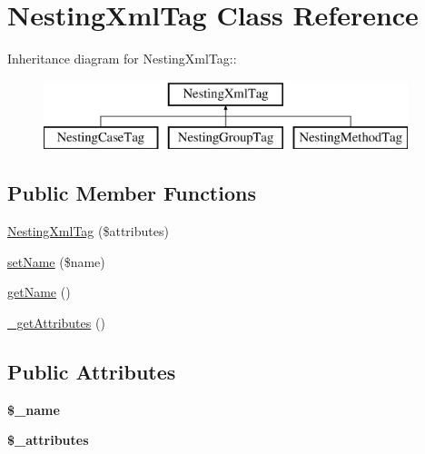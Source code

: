 \hypertarget{class_nesting_xml_tag}{
\section{NestingXmlTag Class Reference}
\label{class_nesting_xml_tag}
}
Inheritance diagram for NestingXmlTag::\begin{figure}[H]
\begin{center}
\leavevmode
\includegraphics[height=2cm]{class_nesting_xml_tag}
\end{center}
\end{figure}
\subsection*{Public Member Functions}
\begin{DoxyCompactItemize}
\item 
\hyperlink{class_nesting_xml_tag_a0d2f0d6d0117c92b40b664d003dda596}{NestingXmlTag} (\$attributes)
\item 
\hyperlink{class_nesting_xml_tag_ae7fcd8fbe018cf263f09e4a4532dd429}{setName} (\$name)
\item 
\hyperlink{class_nesting_xml_tag_aea10453a4bf92a0133dcab1138ff6532}{getName} ()
\item 
\hyperlink{class_nesting_xml_tag_a4f77ec31908ff25ccf780aa1a6d648e2}{\_\-getAttributes} ()
\end{DoxyCompactItemize}
\subsection*{Public Attributes}
\begin{DoxyCompactItemize}
\item 
\hypertarget{class_nesting_xml_tag_a6d522b82e2849369d5c228ea2e4b885d}{
{\bfseries \$\_\-name}}
\label{class_nesting_xml_tag_a6d522b82e2849369d5c228ea2e4b885d}

\item 
\hypertarget{class_nesting_xml_tag_aab513b1b510d3addb7aa0ae695922a0e}{
{\bfseries \$\_\-attributes}}
\label{class_nesting_xml_tag_aab513b1b510d3addb7aa0ae695922a0e}

\end{DoxyCompactItemize}


